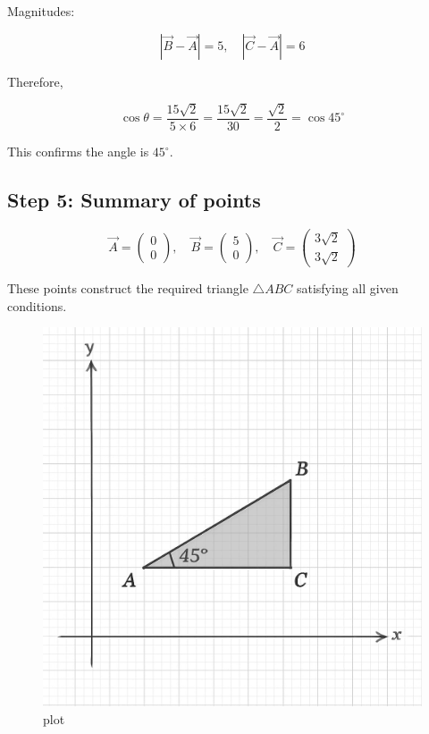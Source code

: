 \documentclass[journal]{IEEEtran}
\begin{document}
Magnitudes:

\[
|\vec{B}-\vec{A}| = 5, \quad |\vec{C}-\vec{A}| = 6
\]

Therefore,

\[
\cos \theta = \frac{15\sqrt{2}}{5 \times 6} = \frac{15\sqrt{2}}{30} = \frac{\sqrt{2}}{2} = \cos 45^\circ
\]

This confirms the angle is $45^\circ$.

\subsection*{\textbf{Step} 5: Summary of points}

\[
\boxed{
\vec{A} = \begin{pmatrix}0 \\ 0\end{pmatrix}, \quad
\vec{B} = \begin{pmatrix}5 \\ 0\end{pmatrix}, \quad
\vec{C} = \begin{pmatrix}3\sqrt{2} \\ 3\sqrt{2}\end{pmatrix}
}
\]

These points construct the required triangle $\triangle ABC$ satisfying all given conditions.



\begin{figure}[htbp]
\centering
\includegraphics[width=0.7\columnwidth]{figs/python_plot.png} 
\caption{plot}
\label{fig:1}
\end{figure}
\end{document}
